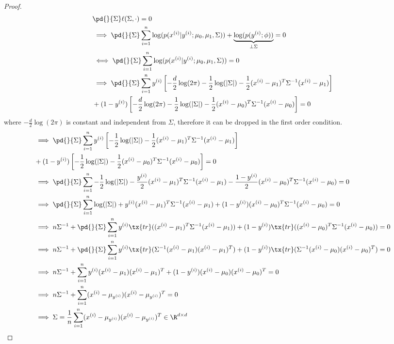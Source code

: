\documentclass[11pt]{article}
\newcommand{\upi}[0]{^{(i)}}
\begin{document}
	\begin{proof}
		\begin{align}
			&\pd{}{\Sigma} \ell(\Sigma, \cdot) = 0 \\
			&\implies \pd{}{\Sigma} \sum_{i=1}^n \log(p(x\upi|y\upi;\mu_0, \mu_1, \Sigma)) 
			+ \underbrace{\log(p(y\upi;\phi))}_{\perp \Sigma} = 0 \\
			&\iff \pd{}{\Sigma} \sum_{i=1}^n \log(p(x\upi|y\upi;\mu_0, \mu_1, \Sigma)) = 0 \\
			&\implies 
			\pd{}{\Sigma} \sum_{i=1}^n y\upi \left [
				-\frac{d}{2} \log(2\pi) - \frac{1}{2} \log(|\Sigma|) - \frac{1}{2} (x\upi - \mu_1)^T \Sigma^{-1} (x\upi - \mu_1)
			\right ] \\
			&+ (1 - y\upi) \left [
				-\frac{d}{2} \log(2\pi) - \frac{1}{2} \log(|\Sigma|) - \frac{1}{2} (x\upi - \mu_0)^T \Sigma^{-1} (x\upi - \mu_0)
			\right ] = 0
		\end{align}
		where $-\frac{d}{2} \log(2\pi)$ is constant and independent from $\Sigma$, therefore it can be dropped in the first order condition.
		\begin{align}
			&\implies \pd{}{\Sigma} \sum_{i=1}^n y\upi \left [- \frac{1}{2} \log(|\Sigma|) - \frac{1}{2} (x\upi - \mu_1)^T \Sigma^{-1} (x\upi - \mu_1)
			\right ] \\
			&+ (1 - y\upi) \left [- \frac{1}{2} \log(|\Sigma|) - \frac{1}{2} (x\upi - \mu_0)^T \Sigma^{-1} (x\upi - \mu_0)
			\right ] = 0 \\
			&\implies \pd{}{\Sigma} \sum_{i=1}^n - \frac{1}{2} \log(|\Sigma|) - \frac{y\upi}{2} (x\upi - \mu_1)^T \Sigma^{-1} (x\upi - \mu_1) - \frac{1-y\upi}{2} (x\upi - \mu_0)^T \Sigma^{-1} (x\upi - \mu_0) = 0 \\
			&\implies \pd{}{\Sigma} \sum_{i=1}^n \log(|\Sigma|) 
			+ y\upi (x\upi - \mu_1)^T \Sigma^{-1} (x\upi - \mu_1) 
			+ (1-y\upi) (x\upi - \mu_0)^T \Sigma^{-1} (x\upi - \mu_0) = 0 \\
			&\implies n \Sigma^{-1} + \pd{}{\Sigma} \sum_{i=1}^n y\upi \tx{tr}((x\upi - \mu_1)^T \Sigma^{-1} (x\upi - \mu_1))
			+ (1-y\upi) \tx{tr}((x\upi - \mu_0)^T \Sigma^{-1} (x\upi - \mu_0)) = 0 \\
			&\implies n \Sigma^{-1} + \pd{}{\Sigma} \sum_{i=1}^n y\upi 
			\tx{tr}(
				\Sigma^{-1} (x\upi - \mu_1) (x\upi - \mu_1)^T
			)
			+ (1 - y\upi) 
			\tx{tr}(
				\Sigma^{-1} (x\upi - \mu_0) (x\upi - \mu_0)^T
			) = 0 \\
			&\implies n \Sigma^{-1} + \sum_{i=1}^n y\upi (x\upi - \mu_1) (x\upi - \mu_1)^T + (1 - y\upi) (x\upi - \mu_0) (x\upi - \mu_0)^T = 0 \\
			&\implies n \Sigma^{-1} + \sum_{i=1}^n (x\upi - \mu_{y\upi}) (x\upi - \mu_{y\upi})^T = 0 \\
			&\implies \Sigma = \frac{1}{n} \sum_{i=1}^n (x\upi - \mu_{y\upi}) (x\upi - \mu_{y\upi})^T \in \R^{d \times d}
		\end{align}
	\end{proof}
	
\end{document}
